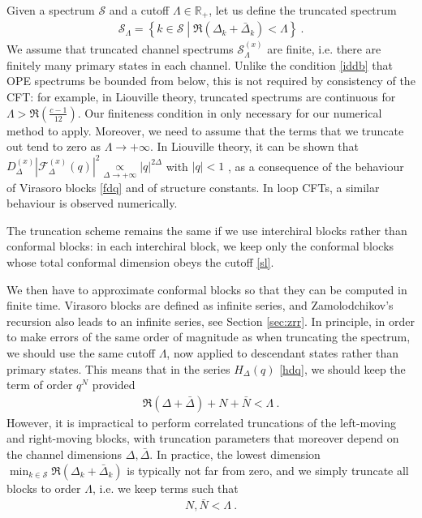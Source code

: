 \documentclass[12pt, a4paper]{article}
\theoremstyle{break}
\begin{document}
Given a spectrum $\mathcal{S}$ and a cutoff $\Lambda \in \mathbb{R}_+$, let us define the truncated spectrum  
\begin{align}
 \mathcal{S}_\Lambda = \left\{ k\in \mathcal{S}\middle| \Re\left(\Delta_k+\bar\Delta_k\right)<\Lambda \right\} \ . 
 \label{sl}
\end{align}
We assume that truncated channel spectrums $\mathcal{S}^{(x)}_\Lambda$ are finite, i.e. there are finitely many primary states in each channel. Unlike the condition \eqref{iddb} that OPE spectrums be bounded from below, this is not required by consistency of the CFT: for example, in Liouville theory, truncated spectrums are continuous for $\Lambda>\Re\left(\frac{c-1}{12}\right)$. Our finiteness condition in only necessary for our numerical method to apply. Moreover, we need to assume that the terms that we truncate out tend to zero as $\Lambda\to +\infty$. In Liouville theory, it can be shown that $D^{(x)}_\Delta \left|\mathcal{F}^{(x)}_\Delta(q)\right|^2 \underset{\Delta\to+\infty}{\propto} |q|^{2\Delta}$ with $|q|<1$ \cite{rs15}, as a consequence of the behaviour of Virasoro blocks \eqref{fdq} and of structure constants. In loop CFTs, a similar behaviour is observed numerically.

The truncation scheme remains the same if we use interchiral blocks rather than conformal blocks: in each interchiral block, we keep only the conformal blocks whose total conformal dimension obeys the cutoff \eqref{sl}. 

We then have to approximate conformal blocks so that they can be computed in finite time. Virasoro blocks are defined as infinite series, and Zamolodchikov's recursion also leads to an infinite series, see Section \ref{sec:zrr}. In principle, in order to make errors of the same order of magnitude as when truncating the spectrum, we should use the same cutoff $\Lambda$, now applied to descendant states rather than primary states. This means that in the series $H_\Delta(q)$ \eqref{hdq}, we should keep the term of order $q^N$ provided 
\begin{align}
 \Re\left(\Delta +\bar\Delta\right) + N + \bar N <\Lambda\ . 
\end{align}
However, it is impractical to perform correlated truncations of the left-moving and right-moving blocks, with truncation parameters that moreover depend on the channel dimensions $\Delta,\bar\Delta$. In practice, the lowest dimension $\min_{k\in\mathcal{S}}\Re\left(\Delta_k+\bar\Delta_k\right)$ is typically not far from zero, and we simply truncate all blocks to order $\Lambda$, i.e. we keep terms such that 
\begin{align}
 N,\bar N < \Lambda \ . 
\end{align}
\end{document}

